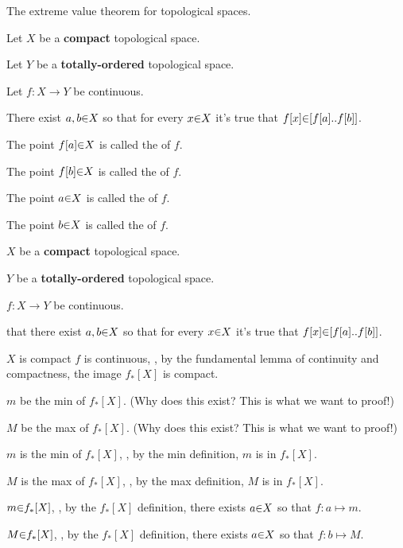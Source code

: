 \vs
\theorem The extreme value theorem for topological spaces. \par
Let $X$ be a {\bf compact}         topological space. \par
Let $Y$ be a {\bf totally-ordered} topological space. \par
Let $f: X \to Y$ be continuous. \par
   There exist $a,b \p\in X$ so that for every $x \p\in X$ it's true that $f[x] \p\in \a[f[a] \a{..} f[b]\a]$. \par
The point $f[a] \p\in X$ is called the     of $f$. \par
The point $f[b] \p\in X$ is called the     of $f$. \par
The point $a    \p\in X$ is called the  of $f$. \par
The point $b    \p\in X$ is called the  of $f$. \par

\proof \par
{} $X$ be a {\bf compact}         topological space. \par
{} $Y$ be a {\bf totally-ordered} topological space. \par
{} $f: X \to Y$ be continuous. \par
{} that there exist $a,b \p\in X$ so that for every $x \p\in X$ it's true that $f[x] \p\in \a[f[a] \a{..} f[b]\a]$. \par

\vs
{} $X$ is compact  $f$ is continuous,
, by the fundamental lemma of continuity and compactness, the image $f_*[X]$ is compact.

\vs
{} $m$ be the min of $f_*[X]$. (Why does this exist? This is what we want to proof!) \par
{} $M$ be the max of $f_*[X]$. (Why does this exist? This is what we want to proof!) \par
{} $m$ is the min of $f_*[X]$, , by the min definition, $m$ is in $f_*[X]$. \par
{} $M$ is the max of $f_*[X]$, , by the max definition, $M$ is in $f_*[X]$. \par
{} $m \p\in f_*[X]$, , by the $f_*[X]$ definition, there exists $a \p\in X$ so that $f: a \mapsto m$. \par
{} $M \p\in f_*[X]$, , by the $f_*[X]$ definition, there exists $a \p\in X$ so that $f: b \mapsto M$. \par

